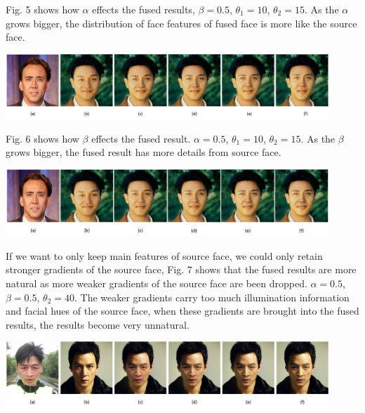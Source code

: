 Fig. 5 shows how $\alpha$ effects the fused results, $\beta = 0.5$, $\theta_1 = 10$, $\theta_2 = 15$. As the $\alpha$ grows bigger, the distribution of face features of fused face is more like the source face.

\begin{center}
    \includegraphics[width=4.8in]{images/pro.png}
\end{center}

Fig. 6 shows how $\beta$ effects the fused result. $\alpha = 0.5$, $\theta_1 = 10$, $\theta_2 = 15$. As the $\beta$ grows bigger, the fused result has more details from source face.

\begin{center}
    \includegraphics[width=4.8in]{images/detail.png}
\end{center}

If we want to only keep main features of source face, we could only retain stronger gradients of the source face, Fig. 7 shows that the fused results are more natural as more weaker gradients of the source face are been dropped. $\alpha = 0.5$, $\beta = 0.5$, $\theta_2 = 40$. The weaker gradients carry too much illumination information and facial hues of the source face, when these gradients are brought into the fused results, the results become very unnatural.

\begin{center}
    \includegraphics[width=4.8in]{images/thd1.png}
\end{center}

